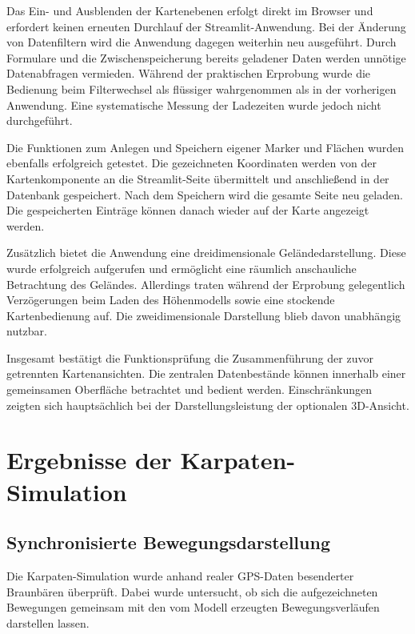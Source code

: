 \documentclass[12pt,a4paper]{report}
\begin{document}
Das Ein- und Ausblenden der Kartenebenen erfolgt direkt
im Browser und erfordert keinen erneuten Durchlauf der
Streamlit-Anwendung. Bei der Änderung von Datenfiltern
wird die Anwendung dagegen weiterhin neu ausgeführt.
Durch Formulare und die Zwischenspeicherung bereits
geladener Daten werden unnötige Datenabfragen vermieden.
Während der praktischen Erprobung wurde die Bedienung
beim Filterwechsel als flüssiger wahrgenommen als in der
vorherigen Anwendung. Eine systematische Messung der
Ladezeiten wurde jedoch nicht durchgeführt.

Die Funktionen zum Anlegen und Speichern eigener Marker
und Flächen wurden ebenfalls erfolgreich getestet.
Die gezeichneten Koordinaten werden von der Kartenkomponente
an die Streamlit-Seite übermittelt und anschließend in
der Datenbank gespeichert. Nach dem Speichern wird die
gesamte Seite neu geladen. Die gespeicherten Einträge
können danach wieder auf der Karte angezeigt werden.

Zusätzlich bietet die Anwendung eine dreidimensionale
Geländedarstellung. Diese wurde erfolgreich aufgerufen
und ermöglicht eine räumlich anschauliche Betrachtung
des Geländes. Allerdings traten während der Erprobung
gelegentlich Verzögerungen beim Laden des Höhenmodells
sowie eine stockende Kartenbedienung auf. Die
zweidimensionale Darstellung blieb davon unabhängig
nutzbar.

Insgesamt bestätigt die Funktionsprüfung die
Zusammenführung der zuvor getrennten Kartenansichten.
Die zentralen Datenbestände können innerhalb einer
gemeinsamen Oberfläche betrachtet und bedient werden.
Einschränkungen zeigten sich hauptsächlich bei der
Darstellungsleistung der optionalen 3D-Ansicht.




\section{Ergebnisse der Karpaten-Simulation}
\label{sec:ergebnisse-karpaten}

\subsection{Synchronisierte Bewegungsdarstellung}

Die Karpaten-Simulation wurde anhand realer GPS-Daten
besenderter Braunbären überprüft. Dabei wurde untersucht,
ob sich die aufgezeichneten Bewegungen gemeinsam mit
den vom Modell erzeugten Bewegungsverläufen darstellen
lassen.
\end{document}
